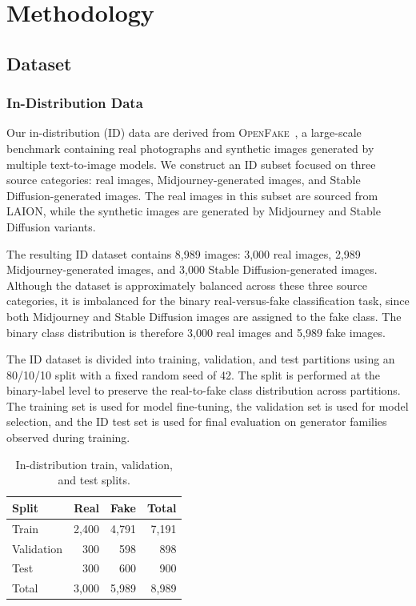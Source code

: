 \section{Methodology}
\label{sec:methodology}

\subsection{Dataset}
\label{subsec:dataset}

\subsubsection{In-Distribution Data}
\label{subsubsec:id-data}

Our in-distribution (ID) data are derived from \textsc{OpenFake}~\cite{livernoche2025openfake}, a large-scale benchmark containing real photographs and synthetic images generated by multiple text-to-image models. We construct an ID subset focused on three source categories: real images, Midjourney-generated images, and Stable Diffusion-generated images. The real images in this subset are sourced from LAION, while the synthetic images are generated by Midjourney and Stable Diffusion variants.

The resulting ID dataset contains 8,989 images: 3,000 real images, 2,989 Midjourney-generated images, and 3,000 Stable Diffusion-generated images. Although the dataset is approximately balanced across these three source categories, it is imbalanced for the binary real-versus-fake classification task, since both Midjourney and Stable Diffusion images are assigned to the fake class. The binary class distribution is therefore 3,000 real images and 5,989 fake images.

The ID dataset is divided into training, validation, and test partitions using an 80/10/10 split with a fixed random seed of 42. The split is performed at the binary-label level to preserve the real-to-fake class distribution across partitions. The training set is used for model fine-tuning, the validation set is used for model selection, and the ID test set is used for final evaluation on generator families observed during training.

\begin{table}[t]
\centering
\caption{In-distribution train, validation, and test splits.}
\label{tab:id-split-counts}
\begin{tabular}{l r r r}
\hline
Split & Real & Fake & Total \\
\hline
Train & 2,400 & 4,791 & 7,191 \\
Validation & 300 & 598 & 898 \\
Test & 300 & 600 & 900 \\
\hline
Total & 3,000 & 5,989 & 8,989 \\
\hline
\end{tabular}
\end{table}

